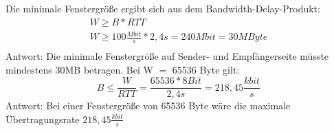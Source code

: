 

Die minimale Fenstergröße ergibt sich aus dem Bandwidth-Delay-Produkt:
\begin{gather*}
    W \geq B * RTT\\
    W \geq 100 \frac{Mbit}{s} * 2,4s = 240 Mbit = 30MByte\\
\end{gather*}
Antwort: Die minimale Fenstergröße auf Sender- und Empfängerseite müsste mindestens 30MB betragen.
Bei W $=$ 65536 Byte gilt:
\[B \leq \frac{W}{RTT} = \frac{65536 * 8 Bit}{2,4s} = 218,45 \frac{kbit}{s}\]
Antwort: Bei einer Fenstergröße von 65536 Byte wäre die maximale Übertragungsrate $218,45 \frac{kbit}{s}$